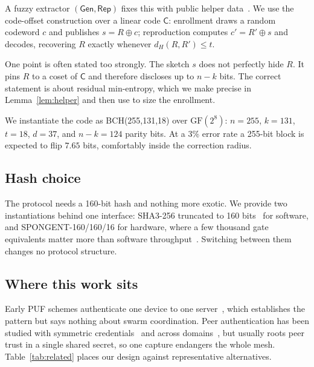 \documentclass[conference]{IEEEtran}
\begin{document}
A fuzzy extractor $(\mathsf{Gen}, \mathsf{Rep})$ fixes this with public helper
data~\cite{dodis_fuzzy,bch_puf_extraction}. We use the code-offset construction
over a linear code $\mathsf{C}$: enrollment draws a random codeword $c$ and
publishes $s = R \oplus c$; reproduction computes $c' = R' \oplus s$ and decodes,
recovering $R$ exactly whenever $d_H(R,R') \le t$.

One point is often stated too strongly. The sketch $s$ does not perfectly hide
$R$. It pins $R$ to a coset of $\mathsf{C}$ and therefore discloses up to $n-k$
bits. The correct statement is about residual min-entropy, which we make precise
in Lemma~\ref{lem:helper} and then use to size the enrollment.

We instantiate the code as BCH(255,131,18) over $\mathrm{GF}(2^8)$: $n=255$,
$k=131$, $t=18$, $d=37$, and $n-k=124$ parity bits. At a 3\% error rate a
255-bit block is expected to flip $7.65$ bits, comfortably inside the correction
radius.

\subsection{Hash choice}

The protocol needs a 160-bit hash and nothing more exotic. We provide two
instantiations behind one interface: SHA3-256 truncated to 160
bits~\cite{sha3_standard} for software, and SPONGENT-160/160/16 for
hardware, where a few thousand gate equivalents matter more than software
throughput~\cite{spongent_original}. Switching between them changes no
protocol structure.

\subsection{Where this work sits}

Early PUF schemes authenticate one device to one
server~\cite{puf_lightweight_uav,puf_iot_strong_adversary,arbiter_puf_iot}, which
establishes the pattern but says nothing about swarm coordination. Peer
authentication has been studied with symmetric
credentials~\cite{peer2peer_auth} and across
domains~\cite{puf_uav_cross_domain,puf_6g_uav}, but usually roots peer trust in
a single shared secret, so one capture endangers the whole mesh. Table~\ref{tab:related}
places our design against representative alternatives.
\end{document}
